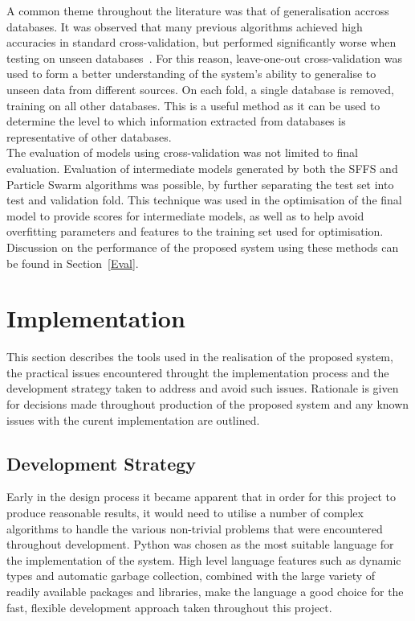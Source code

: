 \documentclass[titlepage, 12pt]{scrartcl} \usepackage{enumitem}
\begin{document}
A common theme throughout the literature was that of generalisation accross
databases. It was observed that many previous algorithms achieved high
accuracies in standard cross-validation, but performed significantly worse when
testing on unseen databases~\parencite{Homsi2017, Bobillo2016}. For this
reason, leave-one-out cross-validation was used to form a better understanding
of the system's ability to generalise to unseen data from different sources. On
each fold, a single database is removed, training on all other databases. This
is a useful method as it can be used to determine the level to which
information extracted from databases is representative of other databases.\\

The evaluation of models using cross-validation was not limited to final
evaluation. Evaluation of intermediate models generated by both the SFFS and Particle Swarm
algorithms was possible, by further separating the test set into test and
validation fold. This technique was used in the optimisation of the
final model to provide scores for intermediate models, as well as to help avoid
overfitting parameters and features to the training set used for
optimisation.\\

Discussion on the performance of the proposed system using these methods can be
found in Section~\ref{Eval}.

\section{Implementation}
This section describes the tools used in the realisation of the
proposed system, the practical issues encountered throught the
implementation process and the development strategy taken to address and avoid
such issues. Rationale is given for decisions made throughout
production of the proposed system and any known issues with the curent implementation are
outlined.

\subsection{Development Strategy}
Early in the design process it became apparent that in order for this project
to produce reasonable results, it would need to utilise a number of complex
algorithms to handle the various non-trivial problems that were encountered
throughout development. Python was chosen as the most suitable language for the
implementation of the system. High level language features such as dynamic
types and automatic garbage collection, combined with the large variety of
readily available packages and libraries, make the language a good choice for
the fast, flexible development approach taken throughout this project.\\
\end{document}
